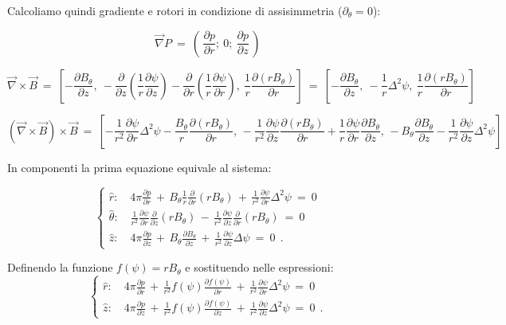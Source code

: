 Calcoliamo quindi gradiente e rotori in condizione di assisimmetria ($\partial_\theta =0$):

\[\vec \nabla P\ =\ \left(\,\frac{\partial p}{\partial r};\ 0;\ \frac{\partial p}{\partial z}\, \right) \]

\[\vec \nabla \times \vec B \ =\
\left[-\frac{\partial B_\theta}{\partial z},\ -\frac{\partial}{\partial z}\left(\frac{1}{r}\frac{\partial \psi}{\partial z}\right)-\frac{\partial}{\partial r}\left(\frac{1}{r}\frac{\partial \psi}{\partial r}\right) ,\ \frac{1}{r}\frac{\partial (r B_\theta)}{\partial r}\right]\ =\ 
\left[-\frac{\partial B_\theta}{\partial z},\ -\frac{1}{r}\Delta^2 \psi,\ \frac{1}{r}\frac{\partial (r B_\theta)}{\partial r}\right]\]

\[(\vec \nabla \times \vec B) \times \vec B\ =\ 
\left[-\frac{1}{r^2}\frac{\partial \psi}{\partial r}\Delta^2 \psi-\frac{B_\theta}{r}\frac{\partial (r B_\theta)}{\partial r},\,
-\frac{1}{r^2}\frac{\partial \psi}{\partial z}\frac{\partial (r B_\theta)}{\partial r}+ \frac{1}{r}\frac{\partial \psi}{\partial r} \frac{\partial B_\theta}{\partial z},\, -B_\theta \frac{\partial B_\theta}{\partial z}-\frac{1}{r^2}\frac{\partial \psi}{\partial z}\Delta^2 \psi\right]\]

In componenti la prima equazione equivale al sistema:

\[\begin{cases}
\hat r:\quad 4\pi \displaystyle\frac{\partial p}{\partial r}\, +\, B_\theta\frac{1}{r} \frac{\partial}{\partial r} (rB_\theta)\, +\, \frac{1}{r^2} \frac{\partial \psi}{\partial r} \Delta^2 \psi\ =\ 0\\
\hat \theta:\quad \displaystyle\frac{1}{r^2} \frac{\partial \psi}{\partial r} \frac{\partial}{\partial z} (rB_\theta)\, -\, \frac{1}{r^2} \frac{\partial \psi}{\partial z}\frac{\partial}{\partial r} (rB_\theta)\ =\ 0\\
\hat z:\quad 4\pi \displaystyle\frac{\partial p}{\partial z}\, +\, B_\theta \frac{\partial B_\theta}{\partial z}\, +\, \frac{1}{r^2}\frac{\partial \psi}{\partial z} \Delta \psi\ =\ 0\ \ .
\end{cases}\]

Definendo la funzione $\boxed{f(\psi)=rB_\theta}$ e sostituendo nelle espressioni:
\[\begin{cases}
	\hat r:\quad 4\pi \frac{\partial p}{\partial r}\, +\, \frac{1}{r^2} f(\psi) \frac{\partial f(\psi)}{\partial r} \, +\, \frac{1}{r^2} \frac{\partial \psi}{\partial r} \Delta^2 \psi\ =\ 0\\
	\hat z:\quad 4\pi \frac{\partial p}{\partial z}\, +\, \frac{1}{r^2} f(\psi) \frac{\partial f(\psi)}{\partial z} \, +\, \frac{1}{r^2} \frac{\partial \psi}{\partial z} \Delta^2 \psi\ =\ 0\ \ .
\end{cases}\]

